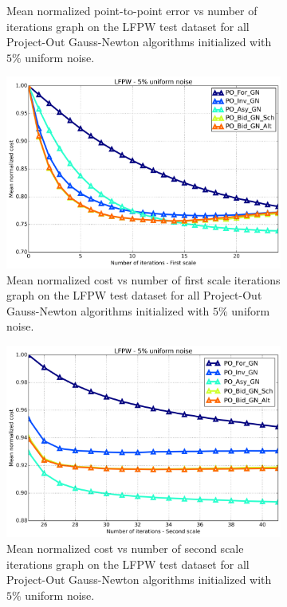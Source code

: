 \begin{figure}[h!]
\begin{subfigure}{0.48\textwidth}
	    \caption{Mean normalized point-to-point error vs number of iterations graph on the LFPW test dataset for all Project-Out Gauss-Newton algorithms initialized with $5\%$ uniform noise.}
	    \label{fig:mean_error_vs_iters_po_gn_5}
	\end{subfigure}
	\par\medskip
	\begin{subfigure}{0.48\textwidth}
	    \includegraphics[width=\textwidth]{experiments/algorithms/po_gn/mean_cost_vs_iters1_po_gn_5.png}
	    \caption{Mean normalized cost vs number of first scale iterations graph on the LFPW test dataset for all Project-Out Gauss-Newton algorithms initialized with $5\%$ uniform noise.}
	    \label{fig:mean_cost_vs_iters1_po_gn_5}
	\end{subfigure}
	\hfill
	\begin{subfigure}{0.48\textwidth}
	    \includegraphics[width=\textwidth]{experiments/algorithms/po_gn/mean_cost_vs_iters2_po_gn_5.png}
	    \caption{Mean normalized cost vs number of second scale iterations graph on the LFPW test dataset for all Project-Out Gauss-Newton algorithms initialized with $5\%$ uniform noise.}
	    \label{fig:mean_cost_vs_iters2_po_gn_5}
	\end{subfigure}
	\label{fig:po_gn_5}
	\caption{}
\end{figure}


